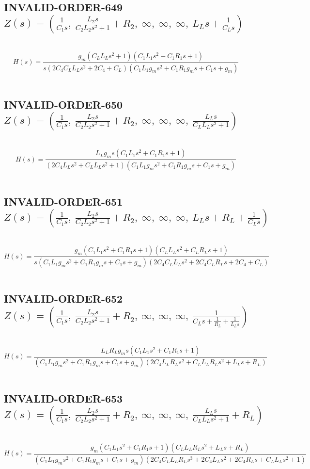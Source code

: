\documentclass{article}
\begin{document}
\subsection{INVALID-ORDER-649 $Z(s) = \left( \frac{1}{C_{1} s}, \  \frac{L_{2} s}{C_{2} L_{2} s^{2} + 1} + R_{2}, \  \infty, \  \infty, \  \infty, \  L_{L} s + \frac{1}{C_{L} s}\right)$ } \ 
\textbf{\[H(s) = \frac{g_{m} \left(C_{L} L_{L} s^{2} + 1\right) \left(C_{1} L_{1} s^{2} + C_{1} R_{1} s + 1\right)}{s \left(2 C_{4} C_{L} L_{L} s^{2} + 2 C_{4} + C_{L}\right) \left(C_{1} L_{1} g_{m} s^{2} + C_{1} R_{1} g_{m} s + C_{1} s + g_{m}\right)}\] } \ 
\subsection{INVALID-ORDER-650 $Z(s) = \left( \frac{1}{C_{1} s}, \  \frac{L_{2} s}{C_{2} L_{2} s^{2} + 1} + R_{2}, \  \infty, \  \infty, \  \infty, \  \frac{L_{L} s}{C_{L} L_{L} s^{2} + 1}\right)$ } \ 
\textbf{\[H(s) = \frac{L_{L} g_{m} s \left(C_{1} L_{1} s^{2} + C_{1} R_{1} s + 1\right)}{\left(2 C_{4} L_{L} s^{2} + C_{L} L_{L} s^{2} + 1\right) \left(C_{1} L_{1} g_{m} s^{2} + C_{1} R_{1} g_{m} s + C_{1} s + g_{m}\right)}\] } \ 
\subsection{INVALID-ORDER-651 $Z(s) = \left( \frac{1}{C_{1} s}, \  \frac{L_{2} s}{C_{2} L_{2} s^{2} + 1} + R_{2}, \  \infty, \  \infty, \  \infty, \  L_{L} s + R_{L} + \frac{1}{C_{L} s}\right)$ } \ 
\textbf{\[H(s) = \frac{g_{m} \left(C_{1} L_{1} s^{2} + C_{1} R_{1} s + 1\right) \left(C_{L} L_{L} s^{2} + C_{L} R_{L} s + 1\right)}{s \left(C_{1} L_{1} g_{m} s^{2} + C_{1} R_{1} g_{m} s + C_{1} s + g_{m}\right) \left(2 C_{4} C_{L} L_{L} s^{2} + 2 C_{4} C_{L} R_{L} s + 2 C_{4} + C_{L}\right)}\] } \ 
\subsection{INVALID-ORDER-652 $Z(s) = \left( \frac{1}{C_{1} s}, \  \frac{L_{2} s}{C_{2} L_{2} s^{2} + 1} + R_{2}, \  \infty, \  \infty, \  \infty, \  \frac{1}{C_{L} s + \frac{1}{R_{L}} + \frac{1}{L_{L} s}}\right)$ } \ 
\textbf{\[H(s) = \frac{L_{L} R_{L} g_{m} s \left(C_{1} L_{1} s^{2} + C_{1} R_{1} s + 1\right)}{\left(C_{1} L_{1} g_{m} s^{2} + C_{1} R_{1} g_{m} s + C_{1} s + g_{m}\right) \left(2 C_{4} L_{L} R_{L} s^{2} + C_{L} L_{L} R_{L} s^{2} + L_{L} s + R_{L}\right)}\] } \ 
\subsection{INVALID-ORDER-653 $Z(s) = \left( \frac{1}{C_{1} s}, \  \frac{L_{2} s}{C_{2} L_{2} s^{2} + 1} + R_{2}, \  \infty, \  \infty, \  \infty, \  \frac{L_{L} s}{C_{L} L_{L} s^{2} + 1} + R_{L}\right)$ } \ 
\textbf{\[H(s) = \frac{g_{m} \left(C_{1} L_{1} s^{2} + C_{1} R_{1} s + 1\right) \left(C_{L} L_{L} R_{L} s^{2} + L_{L} s + R_{L}\right)}{\left(C_{1} L_{1} g_{m} s^{2} + C_{1} R_{1} g_{m} s + C_{1} s + g_{m}\right) \left(2 C_{4} C_{L} L_{L} R_{L} s^{3} + 2 C_{4} L_{L} s^{2} + 2 C_{4} R_{L} s + C_{L} L_{L} s^{2} + 1\right)}\] } \ 
\end{document}

